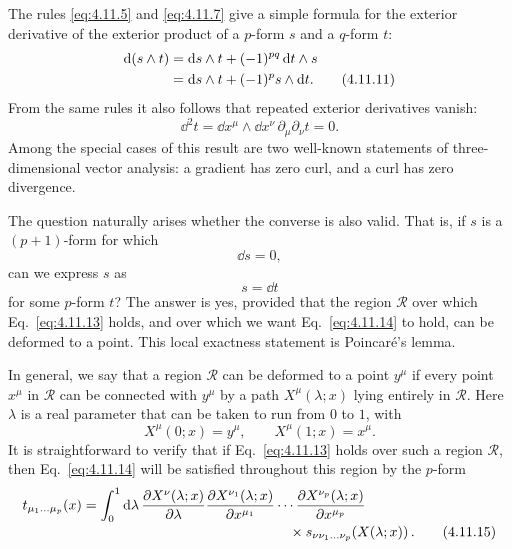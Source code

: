 The rules \eqref{eq:4.11.5} and \eqref{eq:4.11.7} give a simple formula for
the exterior derivative of the exterior product of a \(p\)-form \(s\) and a
\(q\)-form \(t\):
\begin{align}
  \mathop{}\!\mathrm{d}(s\wedge t)
  &=
  \mathop{}\!\mathrm{d} s\wedge t+(-1)^{pq}\mathop{}\!\mathrm{d} t\wedge s
  \notag\\
  &=
  \mathop{}\!\mathrm{d} s\wedge t+(-1)^p s\wedge\mathop{}\!\mathrm{d} t.
  \tag{4.11.11}\label{eq:4.11.11}
\end{align}
From the same rules it also follows that repeated exterior derivatives
vanish:
\begin{equation}
  \dd^2t
  =
  \dd x^\mu\wedge\dd x^\nu\,
  \partial_\mu\partial_\nu t
  =
  0.
  \tag{4.11.12}\label{eq:4.11.12}
\end{equation}
Among the special cases of this result are two well-known statements of
three-dimensional vector analysis: a gradient has zero curl, and a curl has
zero divergence.

The question naturally arises whether the converse is also valid. That is,
if \(s\) is a \((p+1)\)-form for which
\begin{equation}
  \dd s=0,
  \tag{4.11.13}\label{eq:4.11.13}
\end{equation}
can we express \(s\) as
\begin{equation}
  s=\dd t
  \tag{4.11.14}\label{eq:4.11.14}
\end{equation}
for some \(p\)-form \(t\)? The answer is yes, provided that the region
\(\mathcal R\) over which Eq.~\eqref{eq:4.11.13} holds, and over which we
want Eq.~\eqref{eq:4.11.14} to hold, can be deformed to a point. This local
exactness statement is Poincar\'e's lemma.

In general, we say that a region \(\mathcal R\) can be deformed to a point
\(y^\mu\) if every point \(x^\mu\) in \(\mathcal R\) can be connected with
\(y^\mu\) by a path \(X^\mu(\lambda;x)\) lying entirely in \(\mathcal R\).
Here \(\lambda\) is a real parameter that can be taken to run from \(0\) to
\(1\), with
\[
  X^\mu(0;x)=y^\mu,
  \qquad
  X^\mu(1;x)=x^\mu.
\]
It is straightforward to verify that if Eq.~\eqref{eq:4.11.13} holds over
such a region \(\mathcal R\), then Eq.~\eqref{eq:4.11.14} will be satisfied
throughout this region by the \(p\)-form
\begin{align}
  t_{\mu_1\ldots\mu_p}(x)
  &=
  \int_0^1\dd\lambda\,
  \frac{\partial X^\nu(\lambda;x)}{\partial\lambda}
  \frac{\partial X^{\nu_1}(\lambda;x)}{\partial x^{\mu_1}}
  \cdots
  \frac{\partial X^{\nu_p}(\lambda;x)}{\partial x^{\mu_p}}
  \notag\\[-2pt]
  &\hspace{5.2cm}\times
  s_{\nu\nu_1\ldots\nu_p}\!\left(X(\lambda;x)\right).
  \tag{4.11.15}\label{eq:4.11.15}
\end{align}

